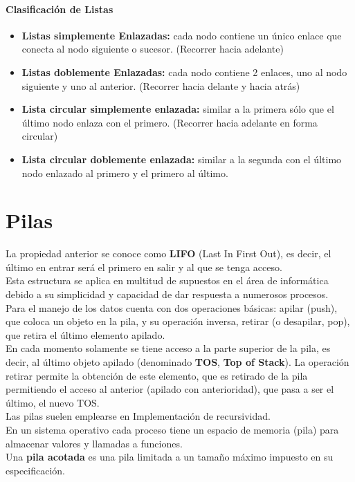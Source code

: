 \documentclass[10pt]{article}
\begin{document}
\paragraph{Clasificación de Listas}

\begin{itemize}
	\item \textbf{Listas simplemente Enlazadas:} cada nodo contiene un único enlace
que conecta al nodo siguiente o sucesor. (Recorrer hacia adelante)
	\item \textbf{Listas doblemente Enlazadas:} cada nodo contiene 2 enlaces, uno al
nodo siguiente y uno al anterior. (Recorrer hacia delante y hacia
atrás)
	\item \textbf{Lista circular simplemente enlazada:} similar a la primera sólo que el
último nodo enlaza con el primero. (Recorrer hacia adelante en
forma circular)
	\item \textbf{Lista circular doblemente enlazada:} similar a la segunda con el
último nodo enlazado al primero y el primero al último.
\end{itemize}

\section{Pilas}
La propiedad anterior se conoce como \textbf{LIFO} (Last In First
Out), es decir, el último en entrar será el primero en salir
y al que se tenga acceso.\\
\linebreak
Esta estructura se aplica en multitud de supuestos en el área de informática debido a su simplicidad y capacidad de dar respuesta a numerosos procesos.\\
\linebreak
Para el manejo de los datos cuenta con dos operaciones básicas: apilar (push), que coloca un objeto en la pila, y su operación inversa, retirar (o desapilar, pop), que retira el último elemento apilado.\\
\linebreak
En cada momento solamente se tiene acceso a la parte superior de la pila, es decir, al último objeto apilado (denominado \textbf{TOS}, \textbf{Top of Stack}). La operación retirar permite la obtención de este elemento, que es retirado de la pila permitiendo el acceso al anterior (apilado con anterioridad), que pasa a ser el último, el nuevo TOS.\\
\linebreak
Las pilas suelen emplearse en Implementación de recursividad.\\
\linebreak
En un sistema operativo cada proceso tiene un espacio de memoria (pila) para almacenar valores y llamadas a funciones.\\
\linebreak
Una \textbf{pila acotada} es una pila limitada a un tamaño máximo impuesto en su especificación.
\end{document}
